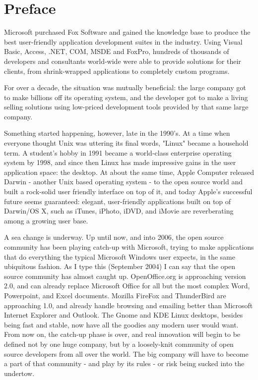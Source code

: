 
\chapter{Preface}

Microsoft purchased Fox Software and gained the knowledge base to produce the best user-friendly application development suites in the industry. Using Visual Basic, Access, .NET, COM, MSDE and FoxPro, hundreds of thousands of developers and consultants world-wide were able to provide solutions for their clients, from shrink-wrapped applications to completely custom programs.

For over a decade, the situation was mutually beneficial: the large company got to make billions off its operating system, and the developer got to make a living selling solutions using low-priced development tools provided by that same large company.

Something started happening, however, late in the 1990's. At a time when everyone thought Unix was uttering its final words, "Linux" became a household term. A student's hobby in 1991 became a world-class enterprise operating system by 1998, and since then Linux has made impressive gains in the user application space: the desktop. At about the same time, Apple Computer released Darwin - another Unix based operating system - to the open source world and built a rock-solid user friendly interface on top of it, and today Apple's successful future seems guaranteed: elegant, user-friendly applications built on top of Darwin/OS X, such as iTunes, iPhoto, iDVD, and iMovie are reverberating among a growing user base.

A sea change is underway. Up until now, and into 2006, the open source community has been playing catch-up with Microsoft, trying to make applications that do everything the typical Microsoft Windows user expects, in the same ubiquitous fashion. As I type this (September 2004) I can say that the open source community has almost caught up. OpenOffice.org is approaching version 2.0, and can already replace Microsoft Office for all but the most complex Word, Powerpoint, and Excel documents. Mozilla FireFox and ThunderBird are approaching 1.0, and already handle browsing and emailing better than Microsoft Internet Explorer and Outlook. The Gnome and KDE Linux desktops, besides being fast and stable, now have all the goodies any modern user would want. From now on, the catch-up phase is over, and real innovation will begin to be defined not by one huge company, but by a loosely-knit community of open source developers from all over the world. The big company will have to become a part of that community - and play by its rules - or risk being sucked into the undertow.

